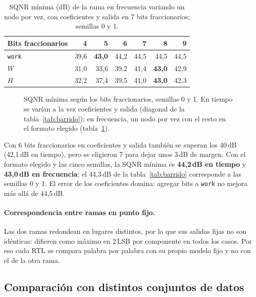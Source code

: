 \begin{table}[h]
  \centering
  \caption{SQNR mínima (dB) de la rama en frecuencia variando un nodo por vez, con coeficientes y salida en 7 bits fraccionarios; semillas 0 y 1.}\label{tab:barrido-frec}
  \begin{tabular}{lrrrrrr}
    \toprule
    Bits fraccionarios & 4 & 5 & 6 & 7 & 8 & 9 \\
    \midrule
    \texttt{work} & 39,6 & \textbf{43,0} & 44,2 & 44,5 & 44,5 & 44,5 \\
    $W$ & 31,0 & 33,6 & 39,2 & 41,4 & \textbf{43,0} & 42,9 \\
    $H$ & 32,2 & 37,4 & 39,5 & 41,0 & \textbf{43,0} & 42,3 \\
    \bottomrule
  \end{tabular}
\end{table}

\begin{figure}[h]
  \centering
  
  \caption{SQNR mínima según los bits fraccionarios, semillas 0 y 1. En tiempo se varían a la vez coeficientes y salida (diagonal de la tabla~\ref{tab:barrido}); en frecuencia, un nodo por vez con el resto en el formato elegido (tabla~\ref{tab:barrido-frec}).}\label{fig:barrido}
\end{figure}

Con 6 bits fraccionarios en coeficientes y salida también se superan los 40\,dB (42,1\,dB en tiempo), pero se eligieron 7 para dejar unos 3\,dB de margen. Con el formato elegido y las cinco semillas, la SQNR mínima es \textbf{44,2\,dB en tiempo} y \textbf{43,0\,dB en frecuencia}; el 44,3\,dB de la tabla~\ref{tab:barrido} corresponde a las semillas 0 y 1. El error de los coeficientes domina: agregar bits a \texttt{work} no mejora más allá de 44,5\,dB.

\paragraph{Correspondencia entre ramas en punto fijo.} Las dos ramas redondean en lugares distintos, por lo que sus salidas fijas no son idénticas: difieren como máximo en 2\,LSB por componente en todos los casos. Por eso cada RTL se compara palabra por palabra con su propio modelo fijo y no con el de la otra rama.

\subsection{Comparación con distintos conjuntos de datos}

